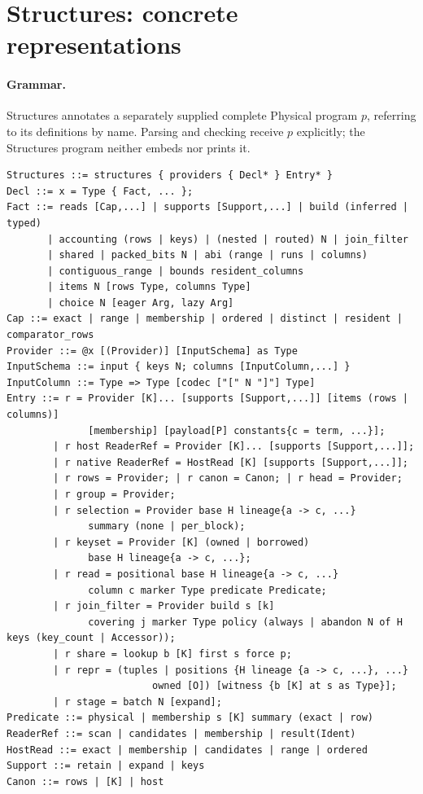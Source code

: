 \section{Structures: concrete representations}
\label{sec:structures}

\paragraph{Grammar.} Structures annotates a separately supplied complete Physical
program $p$, referring to its definitions by name. Parsing and checking receive
$p$ explicitly; the Structures program neither embeds nor prints it.
\begin{lstlisting}
Structures ::= structures { providers { Decl* } Entry* }
Decl ::= x = Type { Fact, ... };
Fact ::= reads [Cap,...] | supports [Support,...] | build (inferred | typed)
       | accounting (rows | keys) | (nested | routed) N | join_filter
       | shared | packed_bits N | abi (range | runs | columns)
       | contiguous_range | bounds resident_columns
       | items N [rows Type, columns Type]
       | choice N [eager Arg, lazy Arg]
Cap ::= exact | range | membership | ordered | distinct | resident | comparator_rows
Provider ::= @x [(Provider)] [InputSchema] as Type
InputSchema ::= input { keys N; columns [InputColumn,...] }
InputColumn ::= Type => Type [codec ["[" N "]"] Type]
Entry ::= r = Provider [K]... [supports [Support,...]] [items (rows | columns)]
              [membership] [payload[P] constants{c = term, ...}];
        | r host ReaderRef = Provider [K]... [supports [Support,...]];
        | r native ReaderRef = HostRead [K] [supports [Support,...]];
        | r rows = Provider; | r canon = Canon; | r head = Provider;
        | r group = Provider;
        | r selection = Provider base H lineage{a -> c, ...}
              summary (none | per_block);
        | r keyset = Provider [K] (owned | borrowed)
              base H lineage{a -> c, ...};
        | r read = positional base H lineage{a -> c, ...}
              column c marker Type predicate Predicate;
        | r join_filter = Provider build s [k]
              covering j marker Type policy (always | abandon N of H keys (key_count | Accessor));
        | r share = lookup b [K] first s force p;
        | r repr = (tuples | positions {H lineage {a -> c, ...}, ...}
                         owned [O]) [witness {b [K] at s as Type}];
        | r stage = batch N [expand];
Predicate ::= physical | membership s [K] summary (exact | row)
ReaderRef ::= scan | candidates | membership | result(Ident)
HostRead ::= exact | membership | candidates | range | ordered
Support ::= retain | expand | keys
Canon ::= rows | [K] | host
\end{lstlisting}

